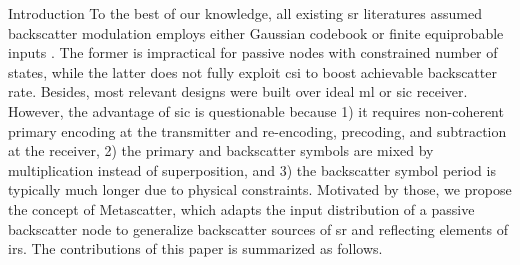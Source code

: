 \documentclass[journal]{IEEEtran}
\begin{document}
\begin{section}{Introduction}
	To the best of our knowledge, all existing \gls{sr} literatures assumed backscatter modulation employs either Gaussian codebook \cite{Guo2019b,Ding2020,Long2020a,Zhou2019a,Wu2021a,Xu2021a,Yang2021a} or finite equiprobable inputs \cite{Yang2018,Han2021,Zhang2022,Xu2020b,Hua2022,Hu2021a}.
	The former is impractical for passive nodes with constrained number of states, while the latter does not fully exploit \gls{csi} to boost achievable backscatter rate.
	Besides, most relevant designs \cite{Guo2019b,Ding2020,Long2020a,Zhou2019a,Wu2021a,Xu2021a,Yang2021a,Yang2018,Han2021,Zhang2022,Xu2020b,Hua2022} were built over ideal \gls{ml} or \gls{sic} receiver.
	However, the advantage of \gls{sic} is questionable because 1) it requires non-coherent primary encoding at the transmitter and re-encoding, precoding, and subtraction at the receiver, 2) the primary and backscatter symbols are mixed by multiplication instead of superposition, and 3) the backscatter symbol period is typically much longer due to physical constraints.
	Motivated by those, we propose the concept of Metascatter, which adapts the input distribution of a passive backscatter node to generalize backscatter sources of \gls{sr} and reflecting elements of \gls{irs}.
	The contributions of this paper is summarized as follows.


\end{section}
\end{document}
